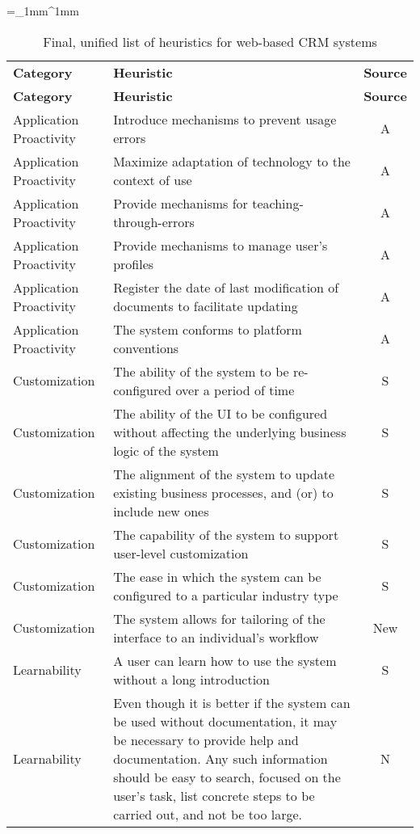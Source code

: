 \begin{singlespace}
		\tabulinesep=_1mm^1mm
	\begin{longtabu} to \textwidth {l X[1, p] c}
			\label{tab:final_list}\\
			\caption{Final, unified list of heuristics for web-based CRM systems}\\
			\toprule
			\textbf{Category} & \textbf{Heuristic} & \textbf{Source} \\
			\midrule
		\endfirsthead
			
			\textbf{Category} & \textbf{Heuristic} & \textbf{Source} \\
			\midrule
		\endhead
		
			\bottomrule
		\endlastfoot
		
		Application Proactivity & Introduce mechanisms to prevent usage errors & A \\
		Application Proactivity & Maximize adaptation of technology to the context of use & A \\
		Application Proactivity & Provide mechanisms for teaching-through-er\-rors & A \\
		Application Proactivity & Provide mechanisms to manage user's profiles & A \\
		Application Proactivity & Register the date of last modification of documents to facilitate updating & A \\
		Application Proactivity & The system conforms to platform conventions & A \\
		Customization & The ability of the system to be re-configured over a period of time & S \\
		Customization & The ability of the UI to be configured without affecting the underlying business logic of the system & S \\
		Customization & The alignment of the system to update existing business processes, and (or) to include new ones & S \\
		Customization & The capability of the system to support user-level customization & S \\
		Customization & The ease in which the system can be configured to a particular industry type & S \\
		Customization & The system allows for tailoring of the interface to an individual's workflow & New \\
		Learnability & A user can learn how to use the system without a long introduction & S \\
		Learnability & Even though it is better if the system can be used without documentation, it may be necessary to provide help and documentation. Any such information should be easy to search, focused on the user's task, list concrete steps to be carried out, and not be too large. & N \\

\end{longtabu}
\end{singlespace}
